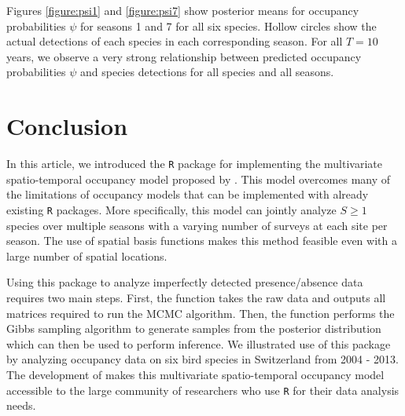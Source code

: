 Figures \ref{figure:psi1} and \ref{figure:psi7} show posterior means for occupancy probabilities $\psi$ for seasons 1 and 7 for all six species. Hollow circles show the actual detections of each species in each corresponding season.  For all $T=10$ years, we observe a very strong relationship between predicted occupancy probabilities $\psi$ and species detections for all species and all seasons. 

\section{Conclusion}

In this article, we introduced the \texttt{R} package  for implementing the multivariate spatio-temporal occupancy model proposed by \citet{hepler2021spatiotemporal}. This model overcomes many of the limitations of occupancy models that can be implemented with already existing \texttt{R} packages. More specifically, this model can jointly analyze $S \geq 1$ species over multiple seasons with a varying number of surveys at each site per season. The use of spatial basis functions makes this method feasible even with a large number of spatial locations. 

Using this package to analyze imperfectly detected presence/absence data requires two main steps. First, the  function takes the raw data and outputs all matrices required to run the MCMC algorithm. Then, the  function performs the Gibbs sampling algorithm to generate samples from the posterior distribution which can then be used to perform inference. We illustrated use of this package by analyzing occupancy data on six bird species in Switzerland from 2004 - 2013. The development of  makes this multivariate spatio-temporal occupancy model accessible to the large community of researchers who use \texttt{R} for their data analysis needs. 

\clearpage

